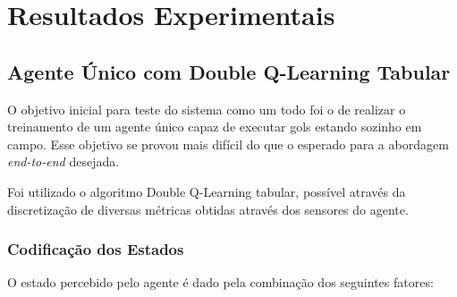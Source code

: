 \chapter{Resultados Experimentais \label{chap:Resultados}}




\section{Agente Único com Double Q-Learning Tabular}



O objetivo inicial para teste do sistema como um todo foi o de realizar o treinamento de um agente único capaz de executar gols estando sozinho em campo. Esse objetivo se provou mais difícil do que o esperado para a abordagem \textit{end-to-end} desejada.

Foi utilizado o algoritmo Double Q-Learning tabular, possível através da discretização de diversas métricas obtidas através dos sensores do agente.

\subsection{Codificação dos Estados}

O estado percebido pelo agente é dado pela combinação dos seguintes fatores:

